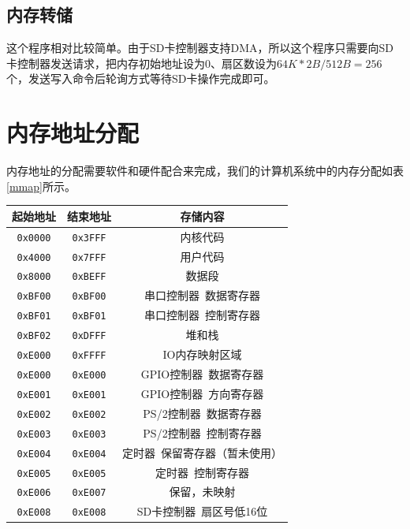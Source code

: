 \documentclass[11pt,utf8]{report}
\begin{document}
\subsection{内存转储}
	\par 这个程序相对比较简单。由于SD卡控制器支持DMA，所以这个程序只需要向SD卡控制器发送请求，把内存初始地址设为0、扇区数设为$64K * 2B / 512B = 256$个，发送写入命令后轮询方式等待SD卡操作完成即可。

\section{内存地址分配}

内存地址的分配需要软件和硬件配合来完成，我们的计算机系统中的内存分配如表\ref{mmap}所示。

\begin{table}[h]
\centering
\begin{tabular}{c|c|c}
\toprule[1.2pt]
\textbf{起始地址} & \textbf{结束地址} & \textbf{存储内容} \\
\midrule[1.2pt]
\texttt{0x0000} & \texttt{0x3FFF} & 内核代码 \\ \hline
\texttt{0x4000} & \texttt{0x7FFF} & 用户代码 \\ \hline
\texttt{0x8000} & \texttt{0xBEFF} & 数据段 \\ \hline
\texttt{0xBF00} & \texttt{0xBF00} & 串口控制器~数据寄存器 \\ \hline
\texttt{0xBF01} & \texttt{0xBF01} & 串口控制器~控制寄存器 \\ \hline
\texttt{0xBF02} & \texttt{0xDFFF} & 堆和栈 \\ \hline
\texttt{0xE000} & \texttt{0xFFFF} & IO内存映射区域 \\ \hline
\texttt{0xE000} & \texttt{0xE000} & GPIO控制器~数据寄存器 \\ \hline
\texttt{0xE001} & \texttt{0xE001} & GPIO控制器~方向寄存器 \\ \hline
\texttt{0xE002} & \texttt{0xE002} & PS/2控制器~数据寄存器 \\ \hline
\texttt{0xE003} & \texttt{0xE003} & PS/2控制器~控制寄存器 \\ \hline
\texttt{0xE004} & \texttt{0xE004} & 定时器~保留寄存器（暂未使用） \\ \hline
\texttt{0xE005} & \texttt{0xE005} & 定时器~控制寄存器 \\ \hline
\texttt{0xE006} & \texttt{0xE007} & 保留，未映射 \\ \hline
\texttt{0xE008} & \texttt{0xE008} & SD卡控制器~扇区号低16位 \\ \hline

\end{tabular}
\end{table}
\end{document}
